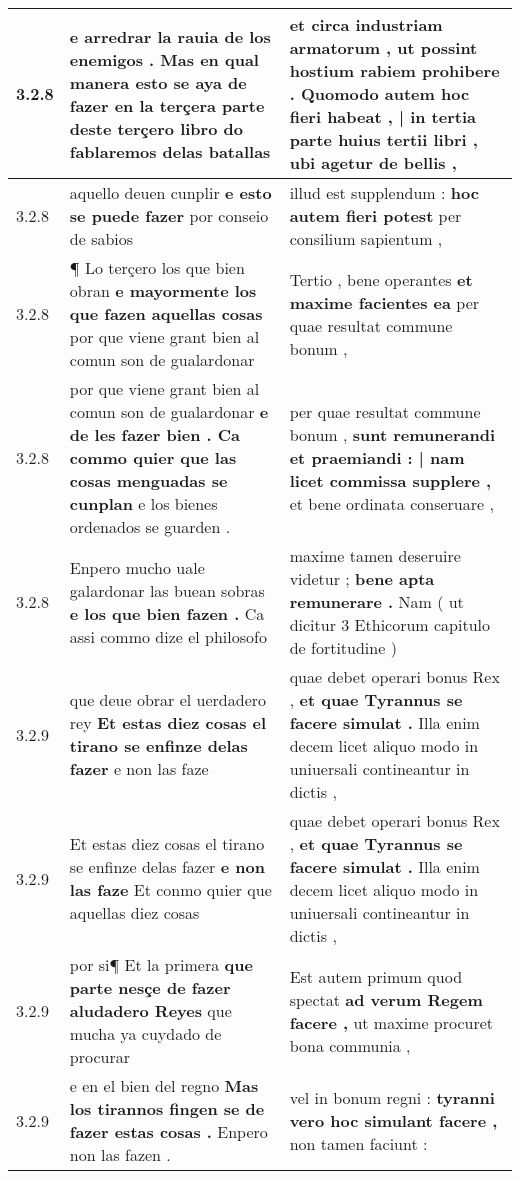 \begin{tabular}{|p{1cm}|p{6.5cm}|p{6.5cm}|}
3.2.8 & e arredrar la rauia de los enemigos . \textbf{ Mas en qual manera esto se aya de fazer en la terçera parte deste terçero libro do } fablaremos delas batallas & et circa industriam armatorum , ut possint hostium rabiem prohibere . \textbf{ Quomodo autem hoc fieri habeat , | in tertia parte huius tertii libri , } ubi agetur de bellis , \\\hline
3.2.8 & aquello deuen cunplir \textbf{ e esto se puede fazer } por conseio de sabios & illud est supplendum : \textbf{ hoc autem fieri potest } per consilium sapientum , \\\hline
3.2.8 & ¶ Lo terçero los que bien obran \textbf{ e mayormente los que fazen aquellas cosas } por que viene grant bien al comun son de gualardonar & Tertio , bene operantes \textbf{ et maxime facientes ea } per quae resultat commune bonum , \\\hline
3.2.8 & por que viene grant bien al comun son de gualardonar \textbf{ e de les fazer bien . Ca commo quier que las cosas menguadas se cunplan } e los bienes ordenados se guarden . & per quae resultat commune bonum , \textbf{ sunt remunerandi et praemiandi : | nam licet commissa supplere , } et bene ordinata conseruare , \\\hline
3.2.8 & Enpero mucho uale galardonar las buean sobras \textbf{ e los que bien fazen . } Ca assi commo dize el philosofo & maxime tamen deseruire videtur ; \textbf{ bene apta remunerare . } Nam ( ut dicitur 3 Ethicorum capitulo de fortitudine ) \\\hline
3.2.9 & que deue obrar el uerdadero rey \textbf{ Et estas diez cosas el tirano se enfinze delas fazer } e non las faze & quae debet operari bonus Rex , \textbf{ et quae Tyrannus se facere simulat . } Illa enim decem licet aliquo modo in uniuersali contineantur in dictis , \\\hline
3.2.9 & Et estas diez cosas el tirano se enfinze delas fazer \textbf{ e non las faze } Et conmo quier que aquellas diez cosas & quae debet operari bonus Rex , \textbf{ et quae Tyrannus se facere simulat . } Illa enim decem licet aliquo modo in uniuersali contineantur in dictis , \\\hline
3.2.9 & por si¶ Et la primera \textbf{ que parte nesçe de fazer aludadero Reyes } que mucha ya cuydado de procurar & Est autem primum quod spectat \textbf{ ad verum Regem facere , } ut maxime procuret bona communia , \\\hline
3.2.9 & e en el bien del regno \textbf{ Mas los tirannos fingen se de fazer estas cosas . } Enpero non las fazen . & vel in bonum regni : \textbf{ tyranni vero hoc simulant facere , } non tamen faciunt : \\\hline

\end{tabular}
